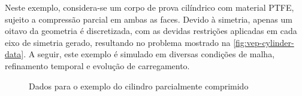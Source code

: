 \documentclass[Tese.tex]{subfiles}
\begin{document}
{Neste exemplo, considera-se um corpo de prova cilíndrico com material PTFE, sujeito a compressão parcial em ambas as faces. Devido à simetria, apenas um oitavo da geometria é discretizada, com as devidas restrições aplicadas em cada eixo de simetria gerado, resultando no problema mostrado na \autoref{fig:vep-cylinder-data}. A seguir, este exemplo é simulado em diversas condições de malha, refinamento temporal e evolução de carregamento.

\begin{figure}[!htb]
	\centering
	\caption{Dados para o exemplo do cilindro parcialmente comprimido}
	\label{fig:vep-cylinder-data}
	{\small
		\noindent{}
	}	
\end{figure}


}
\end{document}
